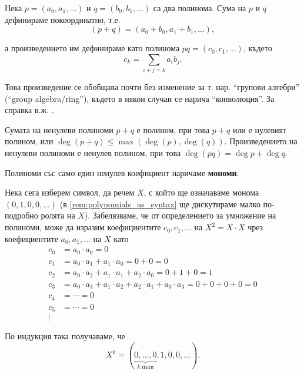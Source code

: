 \documentclass{../../common/topic}
\begin{document}
Нека \( p = (a_0, a_1, \ldots) \) и \( q = (b_0, b_1, \ldots) \) са два полинома. Сума на \( p \) и \( q \) дефинираме покоординатно, т.е.
\begin{equation*}
  (p + q) = (a_0 + b_0, a_1 + b_1, \ldots),
\end{equation*}

а произведението им дефинираме като полинома \( pq = (c_0, c_1, \ldots) \), където
\begin{equation*}
  c_k = \sum_{i+j=k} a_i b_j.
\end{equation*}

\begin{remark}
  Това произведение се обобщава почти без изменение за т. нар. \enquote{групови алгебри} (\enquote{group algebra/ring}), където в някои случаи се нарича \enquote{конволюция}. За справка в.ж. \cite[пример B-1.1.]{Rotman2015AlgebraVol1}.
\end{remark}

Сумата на ненулеви полиноми \( p + q \) е полином, при това \( p + q \) или е нулевият полином, или \( \deg(p + q) \leq \max(\deg(p), \deg(q)) \). Произведението на ненулеви полиноми е ненулев полином, при това \( \deg(pq) = \deg p + \deg q \).

Полиноми със само един ненулев коефициент наричаме \textbf{мономи}.

Нека сега изберем символ, да речем \( X \), с който ще означаваме монома \( (0, 1, 0, 0, \ldots) \) (в \cref{rem:polynomials_as_syntax} ще дискутираме малко по-подробно ролята на \( X \)). Забелязваме, че от определението за умножение на полиноми, може да изразим коефициентите \( c_0, c_1, \ldots \) на \( X^2 = X \cdot X \) чрез коефициентите \( a_0, a_1, \ldots \) на \( X \) като
\begin{align*}
  c_0 &= a_0 \cdot a_0 = 0 \\
  c_1 &= a_0 \cdot a_1 + a_1 \cdot a_0 = 0 + 0 = 0 \\
  c_2 &= a_0 \cdot a_2 + a_1 \cdot a_1 + a_2 \cdot a_0 = 0 + 1 + 0 = 1 \\
  c_3 &= a_0 \cdot a_3 + a_1 \cdot a_2 + a_2 \cdot a_1 + a_0 \cdot a_3 = 0 + 0 + 0 + 0 = 0 \\
  c_4 &= \cdots = 0 \\
  c_5 &= \cdots = 0 \\
  \vdots
\end{align*}

По индукция така получаваме, че
\begin{equation*}
  X^k = (\underbrace{0, \ldots, 0}_{k \text{ пъти}}, 1, 0, 0, \ldots).
\end{equation*}
\end{document}
